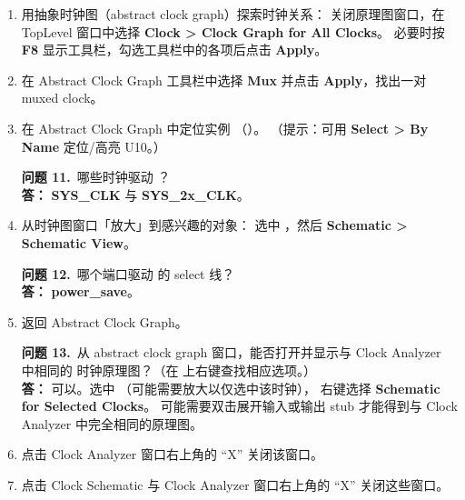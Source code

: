\begin{enumerate}
\begin{questionBox}
\textbf{问题 9.}\ 哪个端口连接到 MUX  的 select pin？\\[0.35em]
\textbf{答：} \textbf{test\_mode}。

\textbf{问题 10.}\ 查看原理图是否有助于理解测试模式下的时钟方案？\\[0.35em]
\textbf{答：} 是——两个时钟进入 MUX：一个来自时钟发生器，一个直接来自端口。
 端口控制 select 线，使测试模式下可旁路时钟发生器，
让设计直接由端口驱动。
\end{questionBox}

  \item 用抽象时钟图（abstract clock graph）探索时钟关系：
        关闭原理图窗口，在 TopLevel 窗口中选择 \textbf{Clock > Clock Graph for All Clocks}。
        必要时按 \textbf{F8} 显示工具栏，勾选工具栏中的各项后点击 \textbf{Apply}。

  \item 在 Abstract Clock Graph 工具栏中选择 \textbf{Mux} 并点击 \textbf{Apply}，找出一对 muxed clock。

  \item 在 Abstract Clock Graph 中定位实例 （）。
        （提示：可用 \textbf{Select > By Name} 定位/高亮 U10。）

\begin{questionBox}
\textbf{问题 11.}\ 哪些时钟驱动 ？\\[0.35em]
\textbf{答：} \textbf{SYS\_CLK} 与 \textbf{SYS\_2x\_CLK}。
\end{questionBox}

  \item 从时钟图窗口「放大」到感兴趣的对象：
        选中 ，然后 \textbf{Schematic > Schematic View}。

\begin{questionBox}
\textbf{问题 12.}\ 哪个端口驱动  的 select 线？\\[0.35em]
\textbf{答：} \textbf{power\_save}。
\end{questionBox}

  \item 返回 Abstract Clock Graph。

\begin{questionBox}
\textbf{问题 13.}\ 从 abstract clock graph 窗口，能否打开并显示与 Clock Analyzer 中相同的
 时钟原理图？（在  上右键查找相应选项。）\\[0.35em]
\textbf{答：} 可以。选中 （可能需要放大以仅选中该时钟），
右键选择 \textbf{Schematic for Selected Clocks}。
可能需要双击展开输入或输出 stub 才能得到与 Clock Analyzer 中完全相同的原理图。
\end{questionBox}

  \item 点击 Clock Analyzer 窗口右上角的 ``X'' 关闭该窗口。

  \item 点击 Clock Schematic 与 Clock Analyzer 窗口右上角的 ``X'' 关闭这些窗口。
\end{enumerate}

